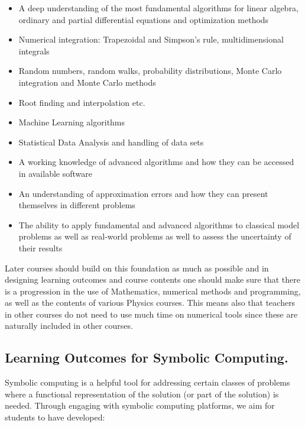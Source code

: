 \documentclass[graybox,envcountchap,sectrefs]{svmult}
\begin{document}
\begin{itemize}
\item A deep understanding of the most fundamental algorithms for linear algebra, ordinary and partial differential equations and optimization methods

\item Numerical integration: Trapezoidal and Simpson's rule, multidimensional integrals

\item Random numbers, random walks, probability distributions, Monte Carlo integration and Monte Carlo methods

\item Root finding and interpolation etc.

\item Machine Learning algorithms 

\item Statistical Data Analysis and handling of data sets

\item A working knowledge of advanced algorithms and how they can be accessed in available software

\item An understanding of approximation errors and how they can present themselves in different problems

\item The ability to apply fundamental and advanced algorithms to classical model problems as well as real-world problems as well to assess the uncertainty of their results
\end{itemize}


Later courses should build on this foundation as much as possible and
in designing learning outcomes and course contents one should make
sure that there is a progression in the use of Mathematics, numerical
methods and programming, as well as the contents of various Physics
courses.  This means also that teachers in other courses do not need
to use much time on numerical tools since these are naturally included
in other courses.



\subsection{Learning Outcomes for Symbolic Computing.}
Symbolic computing is a helpful tool for addressing certain classes of
problems where a functional representation of the solution (or part of
the solution) is needed. Through engaging with symbolic computing
platforms, we aim for students to have developed:
\end{document}
